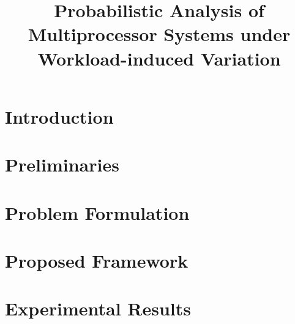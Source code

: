 \documentclass[conference]{IEEEtran}
\title{
  Probabilistic Analysis of Multiprocessor Systems
  under Workload-induced Variation
}
\author{}
\begin{document}
  \maketitle

  \begin{abstract}
    
  \end{abstract}

  \section{Introduction}
  

  \section{Preliminaries}
  

  \section{Problem Formulation}
  

  \section{Proposed Framework}
  

  \section{Experimental Results}
  

  \begingroup
    
    
  \endgroup
\end{document}
